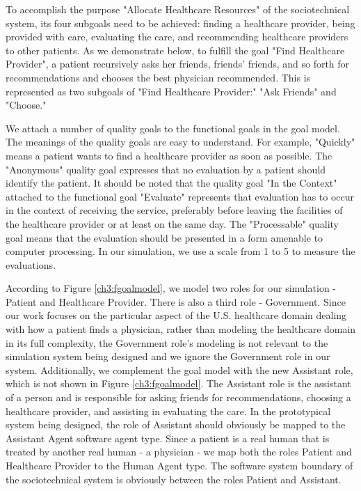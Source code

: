 To accomplish the purpose "Allocate Healthcare Resources" of the sociotechnical system, its four subgoals need to be achieved: finding a healthcare provider, being provided with care, evaluating the care, and recommending healthcare providers to other patients. As we demonstrate below, to fulfill the goal "Find Healthcare Provider", a patient recursively asks her friends, friends' friends, and so forth for recommendations and chooses the best physician recommended. This is represented as two subgoals of "Find Healthcare Provider:" "Ask Friends" and "Choose."

We attach a number of quality goals to the functional goals in the goal model. The meanings of the quality goals are easy to understand. For example, "Quickly" means a patient wants to find a healthcare provider as soon as possible. The "Anonymous" quality goal expresses that no evaluation by a patient should identify the patient. It should be noted that the quality goal "In the Context" attached to the functional goal "Evaluate" represents that evaluation has to occur in the context of receiving the service, preferably before leaving the facilities of the healthcare provider or at least on the same day. The "Processable" quality goal means that the evaluation should be presented in a form amenable to computer processing. In our simulation, we use a scale from 1 to 5 to measure the evaluations.

According to Figure \ref{ch3:fgoalmodel}, we model two roles for our simulation - Patient and Healthcare Provider. There is also a third role - Government. Since our work focuses on the particular aspect of the U.S. healthcare domain dealing with how a patient finds a physician, rather than modeling the healthcare domain in its full complexity, the Government role's modeling is not relevant to the simulation system being designed and we ignore the Government role in our system. Additionally, we complement the goal model with the new Assistant role, which is not shown in Figure \ref{ch3:fgoalmodel}. The Assistant role is the assistant of a person and is responsible for asking friends for recommendations, choosing a healthcare provider, and assisting in evaluating the care. In the prototypical system being designed, the role of Assistant should obviously be mapped to the Assistant Agent software agent type. Since a patient is a real human that is treated by another real human - a physician - we map both the roles Patient and Healthcare Provider to the Human Agent type. The software system boundary of the sociotechnical system is obviously between the roles Patient and Assistant.

